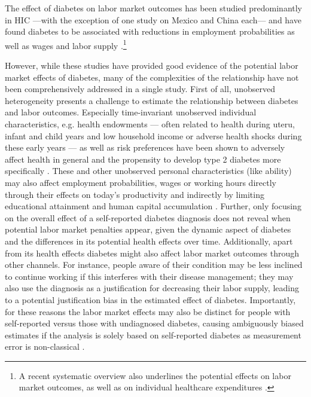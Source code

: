 \documentclass[12pt,english]{article}
\begin{document}
The effect of diabetes on labor market outcomes has been studied predominantly in \ac{HIC} ---with the exception of one study on Mexico \parencite{Seuring2015} and China \parencite{Liu2014} each--- and have found diabetes to be associated with reductions in employment probabilities as well as wages and labor supply \parencite{Brown2005,Brown2014,BrownIII2011,Minor2010,Minor2013,Minor2015,Latif2009}.\footnote{A recent systematic overview also underlines the potential effects on labor market outcomes, as well as on individual healthcare expenditures \parencite{Seuring2015a}.}

However, while these studies have provided good evidence of the potential labor market effects of diabetes, many of the complexities of the relationship have not been comprehensively addressed in a single study. First of all, unobserved heterogeneity presents a challenge to estimate the relationship between diabetes and labor outcomes. Especially time-invariant unobserved individual characteristics, e.g. health endowments --- often related to health during uteru, infant and child years and low household income or adverse health shocks during these early years --- as well as risk preferences have been shown to adversely affect health in general and the propensity to develop type 2 diabetes more specifically \parencite{VanEwijk2011,Sotomayor2013,Li2010b}. These and other unobserved personal characteristics (like ability) may also affect employment probabilities, wages or working hours directly through their effects on today's productivity \parencite{Currie2013} and indirectly by limiting educational attainment and human capital accumulation \parencite{Ayyagari2011a}. Further, only focusing on the overall effect of a self-reported diabetes diagnosis does not reveal when potential labor market penalties appear, given the dynamic aspect of diabetes and the differences in its potential health effects over time. Additionally, apart from its health effects diabetes might also affect labor market outcomes through other channels. For instance, people aware of their condition may be less inclined to continue working if this interferes with their disease management; they may also use the diagnosis as a justification for decreasing their labor supply, leading to a potential justification bias \parencite{Kapteyn2009} in the estimated effect of diabetes. Importantly, for these reasons the labor market effects may also be distinct for people with self-reported versus those with undiagnosed diabetes, causing ambiguously biased estimates if the analysis is solely based on self-reported diabetes as measurement error is non-classical \parencite{Cawley2015}.
\end{document}
